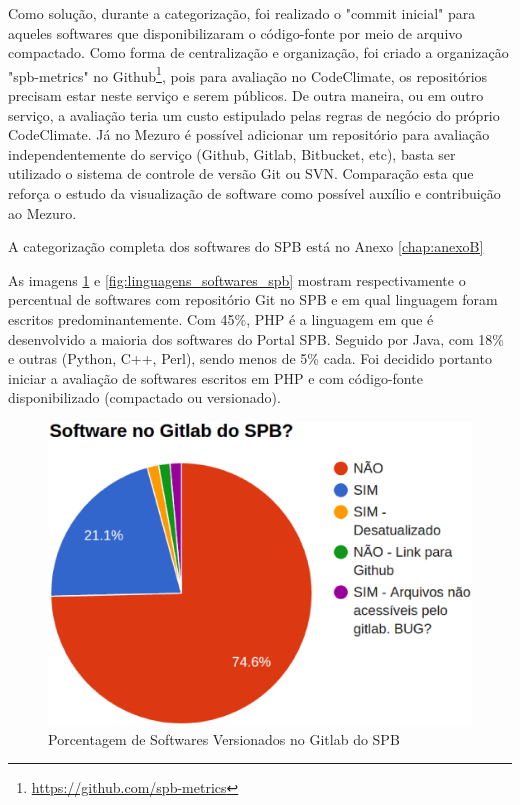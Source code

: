 Como solução, durante a categorização, foi realizado o "commit inicial" para
aqueles softwares que disponibilizaram o código-fonte por meio de arquivo
compactado. Como forma de centralização e organização, foi criado a organização
"spb-metrics" no Github\footnote{\url{https://github.com/spb-metrics}}, pois
para avaliação no CodeClimate, os repositórios precisam estar neste serviço e
serem públicos. De outra maneira, ou em outro serviço, a avaliação teria um
custo estipulado pelas regras de negócio do próprio CodeClimate. Já no Mezuro é
possível adicionar um repositório para avaliação independentemente do serviço
(Github, Gitlab, Bitbucket, etc), basta ser utilizado o sistema de controle de
versão Git ou SVN. Comparação esta que reforça o estudo da visualização de
software como possível auxílio e contribuição ao Mezuro.

A categorização completa dos softwares do SPB está no Anexo \ref{chap:anexoB}

As imagens \ref{fig:is_software_gitlab_spb} e \ref{fig:linguagens_softwares_spb}
mostram respectivamente o percentual de softwares com repositório Git no SPB e
em qual linguagem foram escritos predominantemente. Com 45\%, PHP é a linguagem
em que é desenvolvido a maioria dos softwares do Portal SPB. Seguido por Java,
com 18\% e outras (Python, C++, Perl), sendo menos de 5\% cada. Foi decidido
portanto iniciar a avaliação de softwares escritos em PHP e com código-fonte
disponibilizado (compactado ou versionado).

\begin{figure}[!htb]
	\centering
    \includegraphics[keepaspectratio=true,scale=0.5]
    {figuras/is_software_gitlab_spb.eps}
  \caption{Porcentagem de Softwares Versionados no Gitlab do SPB}
  \label{fig:is_software_gitlab_spb}
\end{figure}


